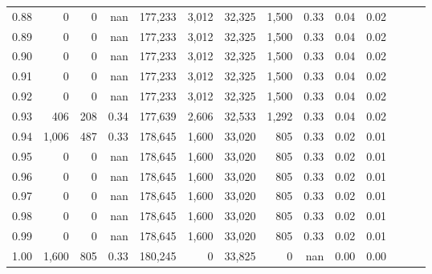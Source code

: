 \begin{tabular}{rrrrrrrrrrrrrr}
0.88 &       0 &      0 &   nan &  177,233 &    3,012 &  32,325 &   1,500 &  0.33 &  0.04 &      0.02 \\
0.89 &       0 &      0 &   nan &  177,233 &    3,012 &  32,325 &   1,500 &  0.33 &  0.04 &      0.02 \\
0.90 &       0 &      0 &   nan &  177,233 &    3,012 &  32,325 &   1,500 &  0.33 &  0.04 &      0.02 \\
0.91 &       0 &      0 &   nan &  177,233 &    3,012 &  32,325 &   1,500 &  0.33 &  0.04 &      0.02 \\
0.92 &       0 &      0 &   nan &  177,233 &    3,012 &  32,325 &   1,500 &  0.33 &  0.04 &      0.02 \\
0.93 &     406 &    208 &  0.34 &  177,639 &    2,606 &  32,533 &   1,292 &  0.33 &  0.04 &      0.02 \\
0.94 &   1,006 &    487 &  0.33 &  178,645 &    1,600 &  33,020 &     805 &  0.33 &  0.02 &      0.01 \\
0.95 &       0 &      0 &   nan &  178,645 &    1,600 &  33,020 &     805 &  0.33 &  0.02 &      0.01 \\
0.96 &       0 &      0 &   nan &  178,645 &    1,600 &  33,020 &     805 &  0.33 &  0.02 &      0.01 \\
0.97 &       0 &      0 &   nan &  178,645 &    1,600 &  33,020 &     805 &  0.33 &  0.02 &      0.01 \\
0.98 &       0 &      0 &   nan &  178,645 &    1,600 &  33,020 &     805 &  0.33 &  0.02 &      0.01 \\
0.99 &       0 &      0 &   nan &  178,645 &    1,600 &  33,020 &     805 &  0.33 &  0.02 &      0.01 \\
1.00 &   1,600 &    805 &  0.33 &  180,245 &        0 &  33,825 &       0 &   nan &  0.00 &      0.00 \\
\bottomrule
\end{tabular}
